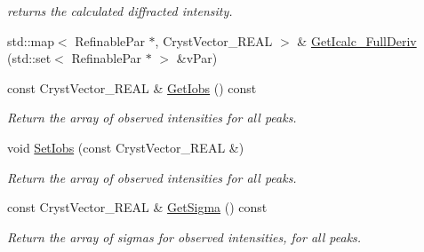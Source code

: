 \begin{DoxyCompactItemize}
\begin{DoxyCompactList}\small\item\em returns the calculated diffracted intensity. \end{DoxyCompactList}\item 
std\+::map$<$ Refinable\+Par $\ast$, Cryst\+Vector\+\_\+\+R\+E\+AL $>$ \& \mbox{\hyperlink{class_obj_cryst_1_1_diffraction_data_single_crystal_a4de874f4ad2ab26bec50a30eef048f01}{Get\+Icalc\+\_\+\+Full\+Deriv}} (std\+::set$<$ Refinable\+Par $\ast$ $>$ \&v\+Par)
\item 
\mbox{\label{class_obj_cryst_1_1_diffraction_data_single_crystal_ae3b0b255b143746347818aa096b1562c}} 
const Cryst\+Vector\+\_\+\+R\+E\+AL \& \mbox{\hyperlink{class_obj_cryst_1_1_diffraction_data_single_crystal_ae3b0b255b143746347818aa096b1562c}{Get\+Iobs}} () const
\begin{DoxyCompactList}\small\item\em Return the array of observed intensities for all peaks. \end{DoxyCompactList}\item 
\mbox{\label{class_obj_cryst_1_1_diffraction_data_single_crystal_aaa8dd9fa1a0f7b3b050c96540992cea1}} 
void \mbox{\hyperlink{class_obj_cryst_1_1_diffraction_data_single_crystal_aaa8dd9fa1a0f7b3b050c96540992cea1}{Set\+Iobs}} (const Cryst\+Vector\+\_\+\+R\+E\+AL \&)
\begin{DoxyCompactList}\small\item\em Return the array of observed intensities for all peaks. \end{DoxyCompactList}\item 
\mbox{\label{class_obj_cryst_1_1_diffraction_data_single_crystal_a489e9bf30e0b36b5a3fc6f5cae301cbd}} 
const Cryst\+Vector\+\_\+\+R\+E\+AL \& \mbox{\hyperlink{class_obj_cryst_1_1_diffraction_data_single_crystal_a489e9bf30e0b36b5a3fc6f5cae301cbd}{Get\+Sigma}} () const
\begin{DoxyCompactList}\small\item\em Return the array of sigmas for observed intensities, for all peaks. \end{DoxyCompactList}\item 
\mbox{\label{class_obj_cryst_1_1_diffraction_data_single_crystal_afec714c8df5dc6a7cf68858dbf70742b}} 

\end{DoxyCompactItemize}
